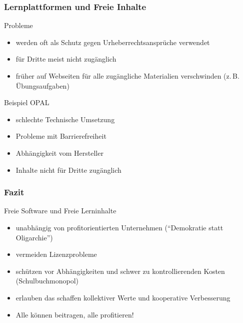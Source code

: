 \documentclass{beamer}
\begin{document}
\begin{frame}
  \frametitle{Lernplattformen und Freie Inhalte}
  \begin{block}{Probleme}
    \begin{itemize}
    \item werden oft als Schutz gegen Urheberrechtsansprüche verwendet
    \item für Dritte meist nicht zugänglich
    \item früher auf Webseiten für alle zugängliche Materialien
      verschwinden (z.\,B. Übungsaufgaben)
    \end{itemize}
  \end{block}

  \begin{block}{Beispiel OPAL}
    \begin{itemize}
    \item schlechte Technische Umsetzung
    \item Probleme mit Barrierefreiheit
    \item Abhängigkeit vom Hersteller
    \item Inhalte nicht für Dritte zugänglich
    \end{itemize}
  \end{block}

\end{frame}

\begin{frame}
  \frametitle{Fazit}
  \begin{block}{Freie Software und Freie Lerninhalte}
    \begin{itemize}
    \item unabhängig von profitorientierten Unternehmen
      (\enquote{Demokratie statt Oligarchie})
    \item vermeiden Lizenzprobleme
    \item schützen vor Abhängigkeiten und schwer zu kontrollierenden Kosten
      (Schulbuchmonopol)
    \item erlauben das schaffen kollektiver Werte und kooperative
      Verbesserung
    \item Alle können beitragen, alle profitieren!
    \end{itemize}
  \end{block}

\end{frame}
\end{document}
